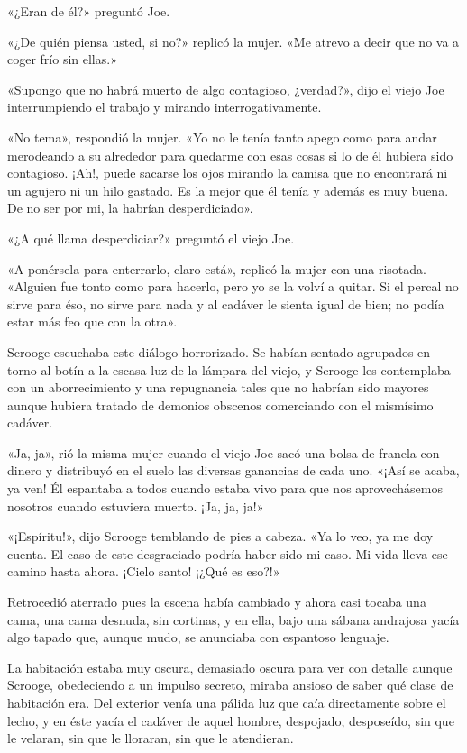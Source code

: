 \documentclass{novela}
\begin{document}
 «¿Eran de él?» preguntó Joe.

 «¿De quién piensa usted, si no?» replicó la mujer. «Me atrevo a decir que no va a coger frío sin ellas.»

 «Supongo que no habrá muerto de algo contagioso, ¿verdad?», dijo el viejo Joe interrumpiendo el trabajo y mirando interrogativamente.

 «No tema», respondió la mujer. «Yo no le tenía tanto apego como para andar merodeando a su alrededor para quedarme con esas cosas si lo de él hubiera sido contagioso. ¡Ah!, puede sacarse los ojos mirando la camisa que no encontrará ni un agujero ni un hilo gastado. Es la mejor que él tenía y además es muy buena. De no ser por mi, la habrían desperdiciado».

 «¿A qué llama desperdiciar?» preguntó el viejo Joe.

 «A ponérsela para enterrarlo, claro está», replicó la mujer con una risotada. «Alguien fue tonto como para hacerlo, pero yo se la volví a quitar. Si el percal no sirve para éso, no sirve para nada y al cadáver le sienta igual de bien; no podía estar más feo que con la otra».

 Scrooge escuchaba este diálogo horrorizado. Se habían sentado agrupados en torno al botín a la escasa luz de la lámpara del viejo, y Scrooge les contemplaba con un aborrecimiento y una repugnancia tales que no habrían sido mayores aunque hubiera tratado de demonios obscenos comerciando con el mismísimo cadáver.

 «Ja, ja», rió la misma mujer cuando el viejo Joe sacó una bolsa de franela con dinero y distribuyó en el suelo las diversas ganancias de cada uno. «¡Así se acaba, ya ven! Él espantaba a todos cuando estaba vivo para que nos aprovechásemos nosotros cuando estuviera muerto. ¡Ja, ja, ja!»

 «¡Espíritu!», dijo Scrooge temblando de pies a cabeza. «Ya lo veo, ya me doy cuenta. El caso de este desgraciado podría haber sido mi caso. Mi vida lleva ese camino hasta ahora. ¡Cielo santo! ¡¿Qué es eso?!»

 Retrocedió aterrado pues la escena había cambiado y ahora casi tocaba una cama, una cama desnuda, sin cortinas, y en ella, bajo una sábana andrajosa yacía algo tapado que, aunque mudo, se anunciaba con espantoso lenguaje.

 La habitación estaba muy oscura, demasiado oscura para ver con detalle aunque Scrooge, obedeciendo a un impulso secreto, miraba ansioso de saber qué clase de habitación era. Del exterior venía una pálida luz que caía directamente sobre el lecho, y en éste yacía el cadáver de aquel hombre, despojado, desposeído, sin que le velaran, sin que le lloraran, sin que le atendieran.
\end{document}
